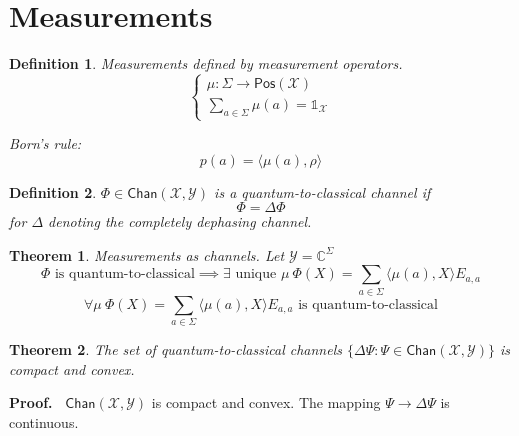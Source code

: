 \documentclass[aps,pra,onecolumn,notitlepage,superscriptaddress]{revtex4-1}
\newcommand{\C}{\mathbb{C}}
\newcommand{\spc}[1]{\mathcal{#1}}
\newcommand{\Pos}{\mathsf{Pos}}
\def\>{\rangle}
\def\<{\langle}
\newcommand{\Chan}{{\mathsf{Chan}}}
\newcommand\I{\mathds{1}}
\newtheorem{theo}{Theorem}
\newtheorem{defi}{Definition}
\def\Proof{{\bf Proof.~}}
\begin{document}
    \section{Measurements}
    \begin{defi}
        Measurements defined by measurement operators.
        \begin{equation}
            \begin{cases}
                \mu: \Sigma \to \Pos(\spc X) \\
                \sum_{a\in \Sigma} \mu(a) = \I_{\spc X}
            \end{cases}
        \end{equation}
        
        Born's rule: 
        \begin{equation}
            p(a) = \< \mu(a), \rho \>
        \end{equation}
    \end{defi}

    \begin{defi}
        $\Phi \in \Chan(\spc X, \spc Y)$ is a quantum-to-classical channel if
        \begin{equation}
            \Phi = \Delta \Phi
        \end{equation}
        for $\Delta$ denoting the completely dephasing channel.
    \end{defi}
        
    \begin{theo}
        Measurements as channels.
        Let $\spc Y = \C^{\Sigma}$
        \begin{equation}
            \Phi \text{ is quantum-to-classical} \implies \exists \text{ unique } \mu \ \Phi(X) = \sum_{a \in \Sigma} \< \mu(a), X \> E_{a,a}
        \end{equation}
        \begin{equation}
            \forall \mu \ \Phi(X) = \sum_{a \in \Sigma} \< \mu(a), X \> E_{a,a} \text{ is quantum-to-classical}
        \end{equation}
    \end{theo}
    
    \begin{theo}
        The set of quantum-to-classical channels $\{ \Delta\Psi : \Psi \in \Chan(\spc X, \spc Y) \}$ is compact and convex.
    \end{theo}
    \Proof {
        $\Chan(\spc X, \spc Y)$ is compact and convex. The mapping $\Psi \to \Delta \Psi$ is continuous.
    }
\end{document}
